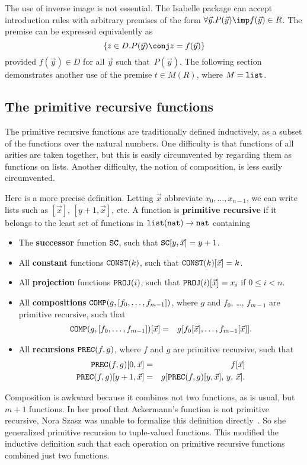The use of inverse image is not essential.  The Isabelle package can accept
introduction rules with arbitrary premises of the form $\forall
\vec{y}.P(\vec{y})\imp f(\vec{y})\in R$.  The premise can be expressed
equivalently as 
\[ \{z\in D. P(\vec{y}) \conj z=f(\vec{y})\} \] 
provided $f(\vec{y})\in D$ for all $\vec{y}$ such that~$P(\vec{y})$.  The
following section demonstrates another use of the premise $t\in M(R)$,
where $M={\tt list}$. 

\subsection{The primitive recursive functions}\label{primrec-sec}
The primitive recursive functions are traditionally defined inductively, as
a subset of the functions over the natural numbers.  One difficulty is that
functions of all arities are taken together, but this is easily
circumvented by regarding them as functions on lists.  Another difficulty,
the notion of composition, is less easily circumvented.

Here is a more precise definition.  Letting $\vec{x}$ abbreviate
$x_0,\ldots,x_{n-1}$, we can write lists such as $[\vec{x}]$,
$[y+1,\vec{x}]$, etc.  A function is {\bf primitive recursive} if it
belongs to the least set of functions in ${\tt list}({\tt nat})\to{\tt nat}$ containing
\begin{itemize}
\item The {\bf successor} function ${\tt SC}$, such that ${\tt SC}[y,\vec{x}]=y+1$.
\item All {\bf constant} functions ${\tt CONST}(k)$, such that
  ${\tt CONST}(k)[\vec{x}]=k$. 
\item All {\bf projection} functions ${\tt PROJ}(i)$, such that
  ${\tt PROJ}(i)[\vec{x}]=x_i$ if $0\leq i<n$. 
\item All {\bf compositions} ${\tt COMP}(g,[f_0,\ldots,f_{m-1}])$, 
where $g$ and $f_0$, \ldots, $f_{m-1}$ are primitive recursive,
such that
\begin{eqnarray*}
  {\tt COMP}(g,[f_0,\ldots,f_{m-1}])[\vec{x}] & = & 
  g[f_0[\vec{x}],\ldots,f_{m-1}[\vec{x}]].
\end{eqnarray*} 

\item All {\bf recursions} ${\tt PREC}(f,g)$, where $f$ and $g$ are primitive
  recursive, such that
\begin{eqnarray*}
  {\tt PREC}(f,g)[0,\vec{x}] & = & f[\vec{x}] \\
  {\tt PREC}(f,g)[y+1,\vec{x}] & = & g[{\tt PREC}(f,g)[y,\vec{x}],\, y,\, \vec{x}].
\end{eqnarray*} 
\end{itemize}
Composition is awkward because it combines not two functions, as is usual,
but $m+1$ functions.  In her proof that Ackermann's function is not
primitive recursive, Nora Szasz was unable to formalize this definition
directly~\cite{szasz93}.  So she generalized primitive recursion to
tuple-valued functions.  This modified the inductive definition such that
each operation on primitive recursive functions combined just two functions.

